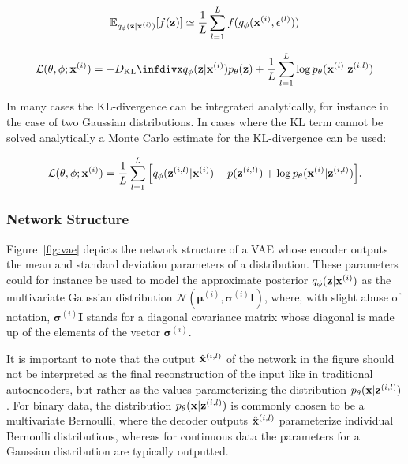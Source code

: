 $$\mathbb{E}_{q_{\mathbf{\phi}}(\mathbf{z} \vert \mathbf{x}^{(i)})}[f(\mathbf{z})] \simeq \frac{1}{L} \sum_{l=1}^{L} f(g_{\mathbf{\phi}}(\mathbf{x}^{(i)}, \mathbf{\epsilon}^{(l)}))$$

\begin{equation}
\mathcal{L}(\btheta, \bphi; \bxi) = -\dkl{\qphi(\bz \vert \bxi)}{\ptheta(\bz)} + \frac{1}{L} \sum_{l=1}^{L} \log \ptheta(\bxi \vert \bz^{(i,l)})
\label{eq:vae_loss}
\end{equation}

In many cases the KL-divergence can be integrated analytically, for instance in the case of two Gaussian distributions. In cases where the KL term cannot be solved analytically a Monte Carlo estimate for the KL-divergence can be used:

\begin{equation}
\mathcal{L}(\mathbf{\theta}, \mathbf{\phi}; \mathbf{x}^{(i)}) = \frac{1}{L} \sum_{l=1}^{L} \Big[q_{\mathbf{\phi}}(\mathbf{z}^{(i,l)} \vert \mathbf{x}^{(i)}) - p(\mathbf{z}^{(i,l)}) + \log p_{\mathbf{\theta}}(\mathbf{x}^{(i)} \vert \mathbf{z}^{(i,l)})\Big].
\label{eq:vae_loss_2}
\end{equation}


\subsubsection{Network Structure}

Figure~\ref{fig:vae} depicts the network structure of a VAE whose encoder outputs the mean and standard deviation parameters of a distribution. These parameters could for instance be used to model the approximate posterior $q_{\mathbf{\phi}}(\mathbf{z} \vert \mathbf{x}^{(i)})$ as the multivariate Gaussian distribution $\mathcal{N}(\mathbf{\mu}^{(i)}, \mathbf{\sigma}^{(i)} \mathbf{I})$, where, with slight abuse of notation, $\mathbf{\sigma}^{(i)} \mathbf{I}$ stands for a diagonal covariance matrix whose diagonal is made up of the elements of the vector $\mathbf{\sigma}^{(i)}$.

It is important to note that the output $\hat{\mathbf{x}}^{(i,l)}$ of the network in the figure should not be interpreted as the final reconstruction of the input like in traditional autoencoders, but rather as the values parameterizing the distribution $p_{\mathbf{\theta}}(\mathbf{x} \vert \mathbf{z}^{(i, l)})$. For binary data, the distribution $p_{\mathbf{\theta}}(\mathbf{x} \vert \mathbf{z}^{(i, l)})$ is commonly chosen to be a multivariate Bernoulli, where the decoder outputs $\hat{\mathbf{x}}^{(i,l)}$ parameterize individual Bernoulli distributions, whereas for continuous data the parameters for a Gaussian distribution are typically outputted.

